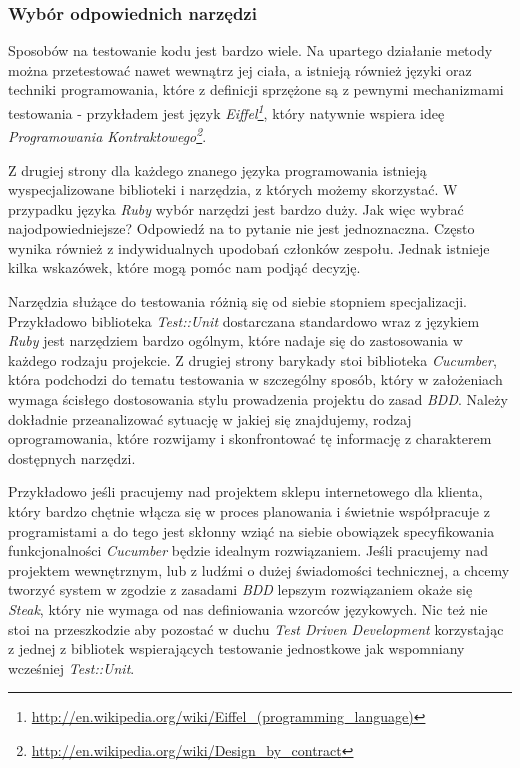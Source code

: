   \subsubsection{Wybór odpowiednich narzędzi}
  Sposobów na testowanie kodu jest bardzo wiele. Na upartego działanie metody można przetestować nawet wewnątrz jej ciała, a istnieją również języki oraz techniki programowania, które z definicji sprzężone są z pewnymi mechanizmami testowania - przykładem jest język \emph{Eiffel\footnote{\url{http://en.wikipedia.org/wiki/Eiffel_(programming_language)}}}, który natywnie wspiera ideę \emph{Programowania Kontraktowego\footnote{\url{http://en.wikipedia.org/wiki/Design_by_contract}}}.
  
  Z drugiej strony dla każdego znanego języka programowania istnieją wyspecjalizowane biblioteki i narzędzia, z których możemy skorzystać. W przypadku języka \emph{Ruby} wybór narzędzi jest bardzo duży. Jak więc wybrać najodpowiedniejsze? Odpowiedź na to pytanie nie jest jednoznaczna. Często wynika również z indywidualnych upodobań członków zespołu. Jednak istnieje kilka wskazówek, które mogą pomóc nam podjąć decyzję.
  
  Narzędzia służące do testowania różnią się od siebie stopniem specjalizacji. Przykładowo biblioteka \emph{Test::Unit} dostarczana standardowo wraz z językiem \emph{Ruby} jest narzędziem bardzo ogólnym, które nadaje się do zastosowania w każdego rodzaju projekcie. Z drugiej strony barykady stoi biblioteka \emph{Cucumber}, która podchodzi do tematu testowania w szczególny sposób, który w założeniach wymaga ścisłego dostosowania stylu prowadzenia projektu do zasad \emph{BDD}. Należy dokładnie przeanalizować sytuację w jakiej się znajdujemy, rodzaj oprogramowania, które rozwijamy i skonfrontować tę informację z charakterem dostępnych narzędzi. 
  
  Przykładowo jeśli pracujemy nad projektem sklepu internetowego dla klienta, który bardzo chętnie włącza się w proces planowania i świetnie współpracuje z programistami a do tego jest skłonny wziąć na siebie obowiązek specyfikowania funkcjonalności \emph{Cucumber} będzie idealnym rozwiązaniem. Jeśli pracujemy nad projektem wewnętrznym, lub z ludźmi o dużej świadomości technicznej, a chcemy tworzyć system w zgodzie z zasadami \emph{BDD} lepszym rozwiązaniem okaże się \emph{Steak}, który nie wymaga od nas definiowania wzorców językowych. Nic też nie stoi na przeszkodzie aby pozostać w duchu \emph{Test Driven Development} korzystając z jednej z bibliotek wspierających testowanie jednostkowe jak wspomniany wcześniej \emph{Test::Unit}.
  
